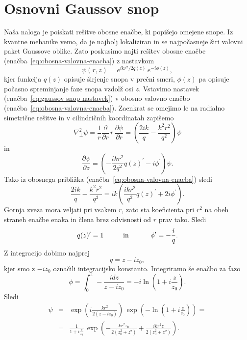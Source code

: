 \section{Osnovni Gaussov snop}
Naša naloga je poiskati rešitve obosne enačbe, ki popišejo omejene
snope. Iz kvantne mehanike vemo, da je najbolj lokaliziran in se najpočasneje
širi valovni paket Gaussove oblike. Zato poskusimo najti rešitev obosne
enačbe (enačba~\ref{eq:obosna-valovna-enacba}) z nastavkom
\begin{equation}
\psi(r,z)=e^{ikr^{2}/2q(z)}\, e^{-i\phi(z)},\label{eq:gaussov-snop-nastavek}
\end{equation}
kjer funkcija $q(z)$ opisuje širjenje snopa v prečni smeri,
$\phi(z)$ pa opisuje počasno spreminjanje faze snopa vzdolž osi $z$.
Vstavimo nastavek (enačba~\ref{eq:gaussov-snop-nastavek}) v obosno valovno enačbo 
(enačba~\ref{eq:obosna-valovna-enacba}). Zaenkrat se omejimo le na radialno 
simetrične rešitve in v cilindričnih koordinatah zapišemo
\begin{equation}
\nabla_{\perp}^{2}\psi=\frac{1}{r}\frac{\partial}{\partial r}\, r\,\frac{\partial\psi}{\partial r}=
\left( \frac{2ik}{q}-\frac{k^2r^2}{q^2}\right)\psi
\end{equation}
 in 
\begin{equation}
\frac{\partial\psi}{\partial z}=\left(-\frac{ikr^{2}}{2q^2}q(z)^{\prime}-i\phi^{\prime}\right)\psi.
\end{equation}
Tako iz obosnega približka (enačba~\ref{eq:obosna-valovna-enacba}) sledi
\begin{equation}
\frac{2ik}{q}-\frac{k^2r^2}{q^2}=ik\left(\frac{ikr^{2}}{q^2}q(z)^{\prime}+2i\phi^{\prime}\right).
\end{equation}
Gornja zveza mora veljati pri vsakem $r$, zato sta koeficienta
pri $r^{2}$ na obeh straneh enačbe enaka in člena brez odvisnosti od $r$ prav tako. Sledi
\begin{equation}
q(z)^{\prime}=1\mbox{\hskip1cm in \hskip1cm}\phi^{\prime}=-\frac{i}{q}.
\end{equation}
Z integracijo dobimo najprej 
\begin{equation}
q=z-iz_{0},
\label{eq:alpha}
\end{equation}
kjer smo z $-i z_{0}$ označili integracijsko konstanto. 
Integriramo še enačbo za fazo 
\begin{equation}
\phi=\int_{0}^{z}\,-\frac{i dz}{z-iz_{0}}=-i\ln(1+i\frac{z}{z_{0}}).
\end{equation}
Sledi
\begin{eqnarray}
\psi & = & \exp\left(i\frac{kr^{2}}{2(z-iz_0)}\right)\,\exp\left(-\ln(1+i\frac{z}{z_{0}})\right)=
\nonumber \\
 & = & \frac{1}{1+i\frac{z}{z_{0}}}\,\exp\left(-\frac{kr^{2}z_{0}}{2(z_{0}^{2}+z^{2})}+
 \frac{ikr^{2}z}{2(z_{0}^{2}+z^{2})}\right).
 \label{eq:gaussov-snop-vmesni}
\end{eqnarray}
